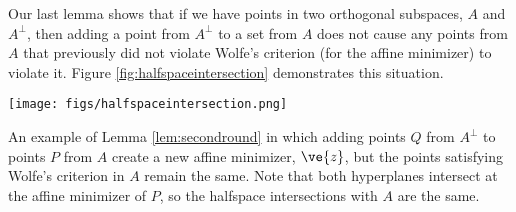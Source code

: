 Our last lemma shows that if we have points in two orthogonal subspaces, $A$ and $A^\perp$, then adding a point from $A^\perp$ to a set from $A$ does not cause any points from $A$ that previously did not violate Wolfe's criterion (for the affine minimizer) to violate it.  Figure \ref{fig:halfspaceintersection} demonstrates this situation.

\begin{myfigure}
\centering
\texttt{[image: figs/halfspaceintersection.png]}
\caption{An example of Lemma \ref{lem:secondround} in which adding points $Q$ from $A^\perp$ to points $P$ from $A$ create a new affine minimizer, $\ve{z}$, but the points satisfying Wolfe's criterion in $A$ remain the same.  Note that both hyperplanes intersect at the affine minimizer of $P$, so the halfspace intersections with $A$ are the same.}
\label{fig:halfspaceintersection}
\end{myfigure}

